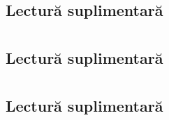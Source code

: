 \documentclass[a4paper,10pt]{article}
\begin{document}
\subsection{Lectură suplimentară}


\section{}
\subsection{}

\subsection{}

\subsection{}

\subsection{Lectură suplimentară}


\section{}
\subsection{}

\subsection{}

\subsection{}

\subsection{Lectură suplimentară}


\section{}
\subsection{}
\end{document}
